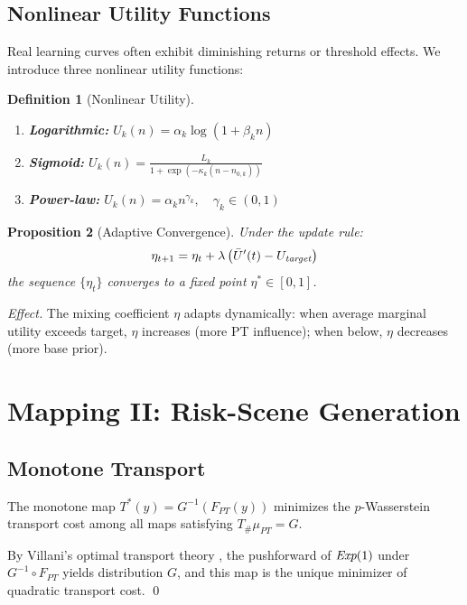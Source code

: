 \documentclass[11pt, a4paper, oneside]{article}
\theoremstyle{plain}
\newtheorem{prop}{Proposition}[section]
\theoremstyle{break}
\theoremstyle{plain}
\theoremstyle{breakdef}
\newtheorem{defi}[prop]{Definition}
\theoremstyle{plain}
\theoremstyle{breakrem}
\theoremstyle{plain}
\theoremstyle{breakrem}
\renewenvironment{Proof}{\par\noindent{\bfseries Proof.}}{\qed\par}
\begin{document}
\subsection{Nonlinear Utility Functions}

Real learning curves often exhibit diminishing returns or threshold effects. We introduce three nonlinear utility functions:

\begin{defi}[Nonlinear Utility]
\begin{enumerate}
    \item \textbf{Logarithmic:} $U_k(n) = \alpha_k \log(1 + \beta_k n)$
    \item \textbf{Sigmoid:} $U_k(n) = \frac{L_k}{1 + \exp(-\kappa_k(n - n_{0,k}))}$
    \item \textbf{Power-law:} $U_k(n) = \alpha_k n^{\gamma_k}, \quad \gamma_k \in (0, 1)$
\end{enumerate}
\end{defi}

\begin{prop}[Adaptive Convergence]
Under the update rule:
\begin{equation}
\eta_{t+1} = \eta_t + \lambda \left( \bar{U}'(t) - U_{\emph{target}} \right)
\end{equation}
the sequence $\{\eta_t\}$ converges to a fixed point $\eta^* \in [0,1]$.
\end{prop}

\textit{Effect.} The mixing coefficient $\eta$ adapts dynamically: when average marginal utility exceeds target, $\eta$ increases (more PT influence); when below, $\eta$ decreases (more base prior).

\section{Mapping II: Risk-Scene Generation}
\label{sec:mapping2}

\subsection{Monotone Transport}

\begin{ theorem}[Optimality]
The monotone map $T^*(y) = G^{-1}(F_{PT}(y))$ minimizes the $p$-Wasserstein transport cost among all maps satisfying $T_\# \mu_{PT} = G$.
\end{ theorem}

\begin{Proof}
By Villani's optimal transport theory \cite{villani2008optimal}, the pushforward of $\emph{Exp}(1)$ under $G^{-1} \circ F_{PT}$ yields distribution $G$, and this map is the unique minimizer of quadratic transport cost.
\end{Proof}
\end{document}
